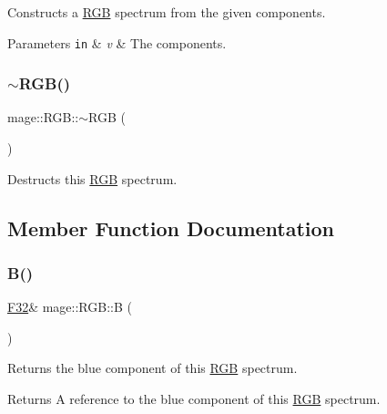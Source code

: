 Constructs a \mbox{\hyperlink{structmage_1_1_r_g_b}{R\+GB}} spectrum from the given components.


\begin{DoxyParams}[1]{Parameters}
\mbox{\tt in}  & {\em v} & The components. \\
\hline
\end{DoxyParams}
\mbox{\label{structmage_1_1_r_g_b_a2c01428e1da4ec354b85320a905beab3}} 
\subsubsection{\texorpdfstring{$\sim$\+R\+G\+B()}{~RGB()}}
{\footnotesize\ttfamily mage\+::\+R\+G\+B\+::$\sim$\+R\+GB (\begin{DoxyParamCaption}{ }\end{DoxyParamCaption})\hspace{0.3cm}{\ttfamily [default]}}

Destructs this \mbox{\hyperlink{structmage_1_1_r_g_b}{R\+GB}} spectrum. 

\subsection{Member Function Documentation}
\mbox{\label{structmage_1_1_r_g_b_a8c3aa800eeb679f42d33e0a029081db3}} 
\subsubsection{\texorpdfstring{B()}{B()}\hspace{0.1cm}{\footnotesize\ttfamily [1/2]}}
{\footnotesize\ttfamily \mbox{\hyperlink{namespacemage_aa97e833b45f06d60a0a9c4fc22ae02c0}{F32}}\& mage\+::\+R\+G\+B\+::B (\begin{DoxyParamCaption}{ }\end{DoxyParamCaption})\hspace{0.3cm}{\ttfamily [noexcept]}}

Returns the blue component of this \mbox{\hyperlink{structmage_1_1_r_g_b}{R\+GB}} spectrum.

\begin{DoxyReturn}{Returns}
A reference to the blue component of this \mbox{\hyperlink{structmage_1_1_r_g_b}{R\+GB}} spectrum. 
\end{DoxyReturn}
\mbox{\label{structmage_1_1_r_g_b_a3f90c799411cc78913e4c0e403c16c7a}} 
